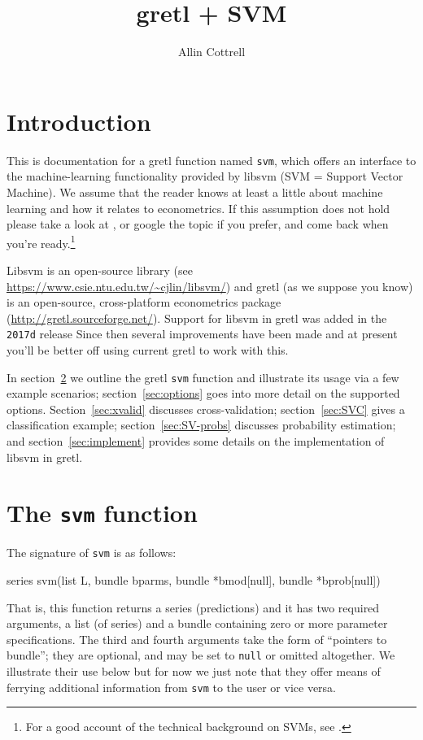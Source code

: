 \documentclass{article}
\begin{document}
\setlength{\parindent}{0pt}
\setlength{\parskip}{1ex}
\setcounter{secnumdepth}{2}

\title{gretl + SVM}
\author{Allin Cottrell}
\maketitle

\section{Introduction}
\label{sec:intro}

This is documentation for a gretl function named \texttt{svm}, which
offers an interface to the machine-learning functionality provided by
\textsf{libsvm} (SVM = Support Vector Machine). We assume that the
reader knows at least a little about machine learning and how it
relates to econometrics. If this assumption does not hold please take
a look at \cite{mull-spiess17}, or google the topic if you prefer, and
come back when you're ready.\footnote{For a good account of the
  technical background on SVMs, see \cite{smola04}.}

\textsf{Libsvm} is an open-source library (see
\url{https://www.csie.ntu.edu.tw/~cjlin/libsvm/}) and gretl (as we
suppose you know) is an open-source, cross-platform econometrics package
(\url{http://gretl.sourceforge.net/}). Support for \textsf{libsvm} in
gretl was added in the \texttt{2017d} release Since then several
improvements have been made and at present you'll be better off using
current gretl to work with this.

In section~\ref{sec:function} we outline the gretl \texttt{svm}
function and illustrate its usage via a few example scenarios;
section~\ref{sec:options} goes into more detail on the supported
options. Section~\ref{sec:xvalid} discusses cross-validation;
section~\ref{sec:SVC} gives a classification example;
section~\ref{sec:SV-probs} discusses probability estimation; and
section~\ref{sec:implement} provides some details on the
implementation of \textsf{libsvm} in gretl.

\section{The \texttt{svm} function}
\label{sec:function}

The signature of \texttt{svm} is as follows:
\begin{code}
series svm(list L, bundle bparms, bundle *bmod[null], bundle *bprob[null])
\end{code}
That is, this function returns a series (predictions) and it has two
required arguments, a list (of series) and a bundle containing zero
or more parameter specifications. The third and fourth arguments take
the form of ``pointers to bundle''; they are optional, and may be set
to \texttt{null} or omitted altogether. We illustrate their use below
but for now we just note that they offer means of ferrying additional
information from \texttt{svm} to the user or vice versa.
\end{document}
